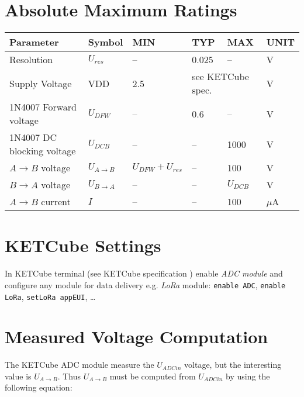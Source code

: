 \documentclass[twoside,a4paper]{refart}
\begin{document}
\section{Absolute Maximum Ratings}
  \begin{table*}[!ht]
    \hspace*{-4cm}
    \begin{tabular}{| p{3.5cm} | p{1.5cm} | p{2cm} | p{2cm} | p{2cm} | p{1cm} |}
        \hline
        \rowcolor{SeaGreen3!30!} {\bf Parameter} & {\bf Symbol} & {\bf MIN} & {\bf TYP} & {\bf MAX} & {\bf UNIT} \\
        \hline
        \hline
        Resolution & $U_{res}$ & -- & 0.025 & -- & V\\
        \hline
        \hline
        Supply Voltage & VDD & 2.5\footnotemark & \multicolumn{2}{l|}{see KETCube spec. \cite{ZCU:KETCube:05-2018}} & V \\
        \hline 
        1N4007 Forward voltage & $U_{DFW}$ & -- & 0.6 & -- & V\\
        \hline 
        1N4007 DC blocking voltage & $U_{DCB}$ & -- & -- & 1000 & V\\
        \hline 
        $A \rightarrow B$ voltage & $U_{A \rightarrow B}$ & $U_{DFW} + U_{res}$ & -- & 100 & V\\
        \hline 
        $B \rightarrow A$ voltage & $U_{B \rightarrow A}$ & -- & -- & $U_{DCB}$ & V\\
        \hline 
        $A \rightarrow B$ current & $I$ & -- & -- & 100 & $\mu$A\\
        \hline
    \end{tabular}
    \label{tab:spec:AMR}
   \end{table*}

\clearpage
\section{KETCube Settings}
  In KETCube terminal (see KETCube specification \cite{ZCU:KETCube:05-2018}) enable {\it ADC module} and configure any module for data delivery e.g. {\it LoRa} module: {\tt enable ADC}, {\tt enable LoRa}, {\tt setLoRa appEUI}, \dots


\section{Measured Voltage Computation}
  The KETCube ADC module measure the $U_{ADCin}$ voltage, but the interesting value is $U_{A \rightarrow B}$. Thus $U_{A \rightarrow B}$ must be computed from  $U_{ADCin}$ by using the following equation:
  
\end{document}
